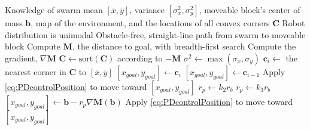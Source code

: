 \begin{algorithm}
\caption{Block-pushing controller for a robotic swarm.}\label{alg:BlockPushing}
\begin{algorithmic}[1]
\Require Knowledge of swarm mean $[\bar{x},\bar{y}]$, variance $[\sigma_x^2, \sigma_y^2]$,  moveable block's center of mass $\mathbf{b}$, map of the environment, and the locations of all convex corners $\mathbf{C}$
\Require Robot distribution is unimodal
\Require Obstacle-free, straight-line path from swarm to moveable block
\State Compute $\mathbf{M}$, the distance to goal, with breadth-first search
\State Compute the gradient, $\nabla \mathbf{M}$
\State $\mathbf{C} \gets \mathrm{sort(\mathbf{C})}$ according to $-\mathbf{M}$
\State $\sigma^2 \gets \max{(\sigma_x,\sigma_y)}$
\State $\mathbf{c}_i \gets$ the nearest corner in $\mathbf{C}$ to $[\bar{x},\bar{y}]$
\State $ [x_{goal}, y_{goal}] \gets \mathbf{c}_i $
\State  $[x_{goal}, y_{goal}] \gets  \mathbf{c}_{i-1}$ 
\State Apply \eqref{eq:PDcontrolPosition} to move toward $[x_{goal}, y_{goal}]$
\EndIf
\EndWhile
\Else  
{}
	\State$r_p \gets k_2 r_b$  
	\Else
	\State$r_p \gets k_3 r_b$  
	\EndIf
\State $[x_{goal}, y_{goal}] \gets \mathbf{b} - r_p \nabla \mathbf{M}(\mathbf{b})$ 
\EndIf
\State Apply \eqref{eq:PDcontrolPosition} to move toward $[x_{goal}, y_{goal}]$
\EndWhile
\end{algorithmic}
\end{algorithm}




